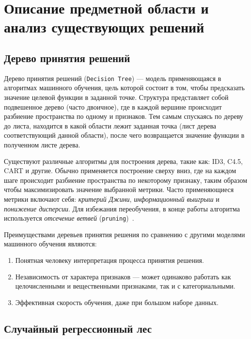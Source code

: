 \chapter{Описание предметной области и анализ существующих решений}

\section{Дерево принятия решений}

Дерево принятия решений (\texttt{Decision Tree})\cite{tree} --- модель
применяющаяся в алгоритмах машинного обучения, цель которой состоит в том, чтобы
предсказать значение целевой функции в заданной точке. Структура представляет
собой подвешенное дерево (часто двоичное), где в каждой вершине происходит
разбиение пространства по одному и признаков. Тем самым спускаясь по дереву до
листа, находится в какой области лежит заданная точка (лист дерева
соответствующий данной области), после чего возвращается значение функции
в полученном листе дерева.

Существуют различные алгоритмы для построения дерева, такие как: ID3, C4.5, CART
и другие. Обычно применяется построение сверху вниз, где на каждом шаге
происходит разбиение пространства по некоторому признаку, таким образом чтобы
максимизировать значение выбранной метрики. Часто применяющиеся метрики включают
себя: \emph{критерий Джини}, \emph{информационный выигрыш} и \emph{понижение
дисперсии}. Для избежания переобучения, в конце работы алгоритма используется
\emph{отсечение ветвей} (\texttt{pruning})~\cite{pruning}.

Преимуществами деревьев принятия решения по сравнению с другими моделями
машинного обучения являются:

\begin{enumerate}
    \item Понятная человеку интерпретация процесса принятия решения.
    \item Независимость от характера признаков --- может одинаково работать как
    целочисленными и вещественными признаками, так и с категориальными.
    \item Эффективная скорость обучения, даже при большом наборе данных.
\end{enumerate}

\section{Случайный регрессионный лес}

